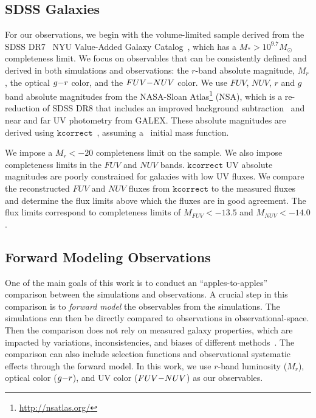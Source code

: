 \subsection{SDSS Galaxies} \label{sec:obs} 
For our observations, we 
begin with the volume-limited \cite{tinker2011} sample derived from the SDSS
DR7~\citep{abazajian2009} NYU Value-Added Galaxy
Catalog~\citep[VAGC;][]{blanton2005}, which has a $M_* > 10^{9.7} M_\odot$
completeness limit. 
We focus on observables that can be consistently defined and derived in both simulations 
and observations: the $r$-band absolute magnitude, $M_r$, the optical $g{-}r$
color, and the $FUV{-}NUV$ color. 
We use $FUV$, $NUV$, $r$ and $g$ band absolute magnitudes from the NASA-Sloan
Atlas\footnote{\url{http://nsatlas.org/}} (NSA), which is a re-reduction of SDSS DR8
\citep{aihara2011} that includes an improved background subtraction~\citep{blanton2011} 
and near and far UV photometry from GALEX. These absolute magnitudes are
derived using $\mathtt{kcorrect}$~\citep{blanton2007a}, assuming
a~\cite{chabrier2003} initial mass function. 

We impose a $M_r < -20$ completeness limit on the \cite{tinker2011} sample.
We also impose completeness limits in the $FUV$ and $NUV$ bands. 
$\mathtt{kcorrect}$ UV absolute magnitudes are poorly constrained for
galaxies with low UV fluxes. 
We compare the reconstructed $FUV$ and $NUV$ fluxes from
$\mathtt{kcorrect}$ to the measured fluxes and determine the flux limits
above which the fluxes are in good agreement. 
The flux limits correspond to completeness limits of $M_{FUV} < -13.5$  and
$M_{NUV} < -14.0$. 

\subsection{Forward Modeling Observations} \label{sec:fm} 
One of the main goals of this work is to conduct an ``apples-to-apples''
comparison between the simulations and observations. 
A crucial step in this comparison is to \emph{forward model} the
observables from the simulations. 
The simulations can then be directly compared to observations in
observational-space. 
Then the comparison does not rely on measured galaxy properties,
which are impacted by variations, inconsistencies, and biases of different
methods~\citep{dickey2020}. 
The comparison can also include selection functions and observational systematic
effects through the forward model. 
In this work, we use $r$-band luminosity ($M_r$), optical color ($g{-}r$),
and UV color ($FUV{-}NUV$) as our observables. 

